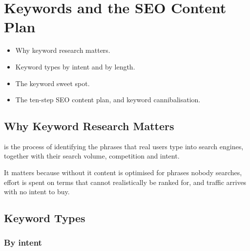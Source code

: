 \chapter{Keywords and the SEO Content Plan}


\begin{learningoutcomes}
\begin{itemize}
\item Why keyword research matters.
\item Keyword types by intent and by length.
\item The keyword sweet spot.
\item The ten-step SEO content plan, and keyword cannibalisation.
\end{itemize}
\end{learningoutcomes}

\section{Why Keyword Research Matters}

\begin{exambox}
 is the process of identifying the
phrases that real users type into search engines, together with their search
volume, competition and intent.

\smallskip
It matters because without it content is optimised for phrases nobody searches,
effort is spent on terms that cannot realistically be ranked for, and traffic
arrives with no intent to buy.
\end{exambox}

\section{Keyword Types}

\subsection{By intent}

